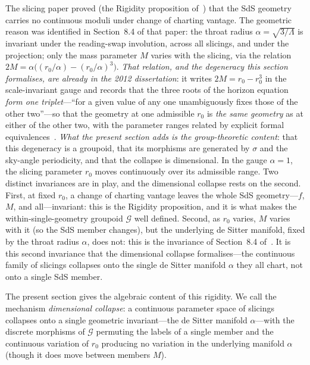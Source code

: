 \documentclass[11pt,a4paper]{article}
\theoremstyle{definition}
\begin{document}
The slicing paper proved (the Rigidity proposition of~\cite{JanzenSlicing}) that the SdS geometry carries no continuous moduli under change of charting vantage. The geometric reason was identified in Section~8.4 of that paper: the throat radius $\alpha=\sqrt{3/\Lambda}$ is invariant under the reading-swap involution, across all slicings, and under the projection; only the mass parameter $M$ varies with the slicing, via the relation $2M=\alpha\bigl((r_{0}/\alpha)-(r_{0}/\alpha)^{3}\bigr)$. \emph{That relation, and the degeneracy this section formalises, are already in the 2012 dissertation}: it writes $2M=r_{0}-r_{0}^{3}$ in the scale-invariant gauge and records that the three roots of the horizon equation \emph{form one triplet}---``for a given value of any one unambiguously fixes those of the other two''---so that the geometry at one admissible $r_{0}$ is \emph{the same geometry} as at either of the other two, with the parameter ranges related by explicit formal equivalences~\cite[\S ch.~4]{JanzenThesis}. \emph{What the present section adds is the group-theoretic content}: that this degeneracy is a groupoid, that its morphisms are generated by $\sigma$ and the sky-angle periodicity, and that the collapse is dimensional. In the gauge $\alpha=1$, the slicing parameter $r_{0}$ moves continuously over its admissible range. Two distinct invariances are in play, and the dimensional collapse rests on the second. First, at fixed $r_{0}$, a change of charting vantage leaves the whole SdS geometry---$f$, $M$, and all---invariant: this is the Rigidity proposition, and it is what makes the within-single-geometry groupoid $\mathcal{G}$ well defined. Second, as $r_{0}$ varies, $M$ varies with it (so the SdS member changes), but the underlying de Sitter manifold, fixed by the throat radius $\alpha$, does not: this is the invariance of Section~8.4 of~\cite{JanzenSlicing}. It is this second invariance that the dimensional collapse formalises---the continuous family of slicings collapses onto the single de Sitter manifold $\alpha$ they all chart, not onto a single SdS member.

The present section gives the algebraic content of this rigidity. We call the mechanism \emph{dimensional collapse}: a continuous parameter space of slicings collapses onto a single geometric invariant---the de Sitter manifold $\alpha$---with the discrete morphisms of $\mathcal{G}$ permuting the labels of a single member and the continuous variation of $r_{0}$ producing no variation in the underlying manifold $\alpha$ (though it does move between members $M$).
\end{document}
